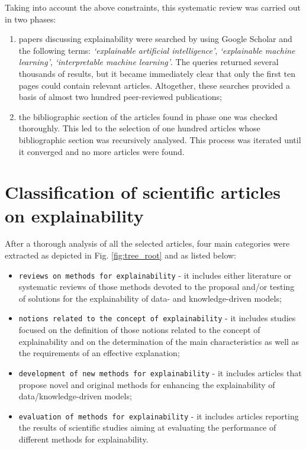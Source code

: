 \documentclass[final,1p,times]{elsarticle}
\begin{document}
\noindent Taking into account the above constraints, this systematic review was carried out in two phases:
\begin{enumerate}
\item papers discussing explainability were searched by using Google Scholar and the following terms: 
\emph{`explainable artificial intelligence'},
\emph{`explainable machine learning'}, 
\emph{`interpretable machine learning'}. 
The queries returned several thousands of results, but it became immediately clear that only the first ten pages could contain relevant articles. Altogether, these searches provided a basis of almost two hundred peer-reviewed publications;
\item the bibliographic section of the articles found in phase one was checked thoroughly. This led to the selection of one hundred articles whose bibliographic section was recursively analysed. This process was iterated until it converged and no more  articles were found.
\end{enumerate}

\section{Classification of scientific articles on explainability}\label{classification}
After a thorough analysis of all the selected articles, four main categories were extracted as depicted in Fig. \ref{fig:tree_root} and as listed below:
\begin{itemize}
\item {\verb|reviews on methods for explainability|} - it includes either literature or systematic reviews of those methods devoted to the proposal and/or testing of solutions for the explainability of data- and knowledge-driven models;
\item {\verb|notions related to the concept of explainability|} - it includes studies focused on the definition of those notions related to the concept of explainability and on the determination of the main characteristics as well as the requirements of an effective explanation; 
\item {\verb|development of new methods for explainability|} - it includes articles that propose novel and original methods for enhancing the explainability of data/knowledge-driven models;
\item {\verb|evaluation of methods for explainability|} - it includes articles reporting the results of scientific studies aiming at evaluating the performance of different methods for explainability.
\end{itemize}
\end{document}
